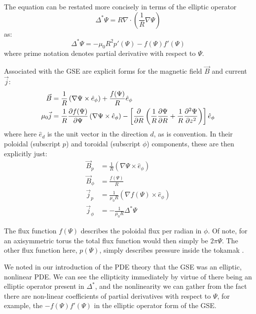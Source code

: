 \begin{remark}
    The equation can be restated more concisely in terms of the elliptic operator
    $$\Delta^{*} \Psi = R \nabla \cdot \left ( \frac{1}{R} \nabla \Psi \right )$$
    as:
    \begin{equation*}
        \Delta^{*} \Psi = -\mu_0 R^2 p'(\Psi) - f(\Psi) f'(\Psi)
    \end{equation*}
    where prime notation denotes partial derivative with respect to $\Psi$.
\end{remark}

\begin{corollary}
    Associated with the GSE are explicit forms for the magnetic field $\vec{B}$ and current $\vec{j}$:
    \begin{align}
        \vec{B} &= \frac{1}{R} \left ( \nabla \Psi \times \hat{e}_{\phi} \right ) + \frac{f(\Psi)}{R} \hat{e}_{\phi} \\
        \mu_0 \vec{j}   &= \frac{1}{R} \pdv{f(\Psi)}{\Psi} \left ( \nabla \Psi \times \hat{e}_{\phi} \right ) - \left [ \pdv{}{R} \left ( \frac{1}{R} \pdv{\Psi}{R} + \frac{1}{R} \pdv[2]{\Psi}{z}\right ) \right ] \hat{e}_{\phi}
    \end{align}
    where here $\hat{e}_{d}$ is the unit vector in the direction $d$, as is convention. In their poloidal (subscript $p$) and toroidal (subscript $\phi$) components, these are then explicitly just:
    \begin{align*}
        \vec{B}_p &= \frac{1}{R} \left ( \nabla \Psi \times \hat{e}_{\phi} \right ) \\
        \vec{B}_{\phi} &= \frac{f(\Psi)}{R} \\
        \vec{j}_p &= \frac{1}{\mu_0 R} \left ( \nabla f(\Psi) \times \hat{e}_{\phi}\right )\\
        \vec{j}_{\phi} &= -\frac{1}{\mu_0 R} \Delta^{*} \Psi
    \end{align*}
\end{corollary}

\begin{remark}
    The flux function $f(\Psi)$ describes the poloidal flux per radian in $\phi$. Of note, for an axisymmetric torus the 
    total flux function would then simply be $2\pi \Psi$. The other flux function here, $p(\Psi)$, simply describes pressure 
    inside the tokamak \cite{gse-derivation}. 
\end{remark}

\begin{remark}
    We noted in our introduction of the PDE theory that the GSE was an elliptic, nonlinear PDE. We can see the 
    ellipticity immediately by virtue of there being an elliptic operator present in $\Delta^{*}$, and the nonlinearity 
    we can gather from the fact there are non-linear coefficients of partial derivatives with respect to $\Psi$, for example, the  
    $-f(\Psi)f'(\Psi)$ in the elliptic operator form of the GSE.
\end{remark}

